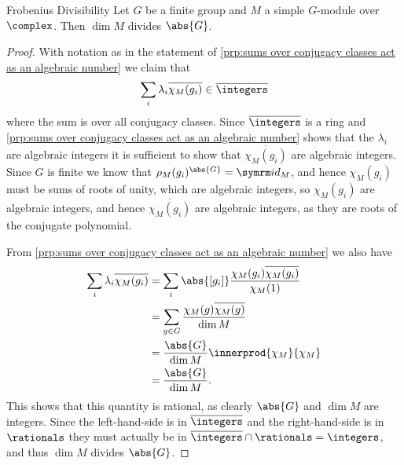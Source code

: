 \begin{thm}{Frobenius Divisibility}{}
    Let \(G\) be a finite group and \(M\) a simple \(G\)-module over \(\complex\).
    Then \(\dim M\) divides \(\abs{G}\).
    \begin{proof}
        With notation as in the statement of \cref{prp:sums over conjugacy classes act as an algebraic number} we claim that
        \begin{equation}
            \sum_i \lambda_i \overline{\chi_M(g_i)} \in \algIntegers
        \end{equation}
        where the sum is over all conjugacy classes.
        Since \(\algIntegers\) is a ring and \cref{prp:sums over conjugacy classes act as an algebraic number} shows that the \(\lambda_i\) are algebraic integers it is sufficient to show that \(\overline{\chi_M(g_i)}\) are algebraic integers.
        Since \(G\) is finite we know that \(\rho_M(g_i)^{\abs{G}} = \id_M\), and hence \(\chi_M(g_i)\) must be sums of roots of unity, which are algebraic integers, so \(\chi_M(g_i)\) are algebraic integers, and hence \(\overline{\chi_M(g_i)}\) are algebraic integers, as they are roots of the conjugate polynomial.
        
        From \cref{prp:sums over conjugacy classes act as an algebraic number} we also have
        \begin{align}
            \sum_i \lambda_i \overline{\chi_M(g_i)} &= \sum_i \abs{[g_i]} \frac{\chi_M(g_i) \overline{\chi_M(g_i)}}{\chi_M(1)}\\
            &= \sum_{g \in G} \frac{\chi_M(g) \overline{\chi_M(g)}}{\dim M}\\
            &= \frac{\abs{G}}{\dim M} \innerprod{\chi_M}{\chi_M}\\
            &= \frac{\abs{G}}{\dim M}.
        \end{align}
        This shows that this quantity is rational, as clearly \(\abs{G}\) and \(\dim M\) are integers.
        Since the left-hand-side is in \(\algIntegers\) and the right-hand-side is in \(\rationals\) they must actually be in \(\algIntegers \cap \rationals = \integers\), and thus \(\dim M\) divides \(\abs{G}\).
    \end{proof}
\end{thm}

